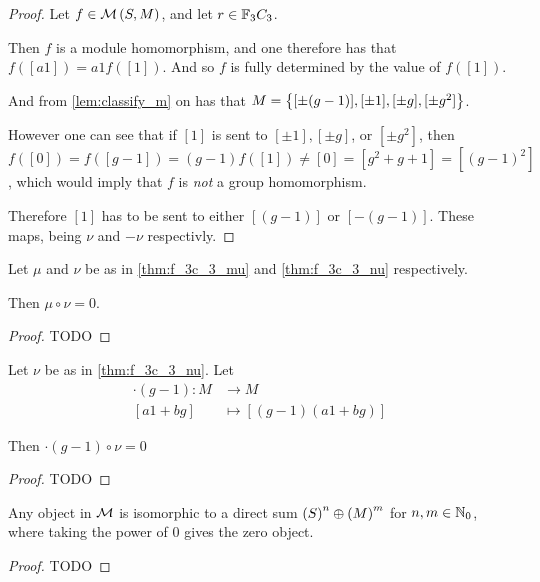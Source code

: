 \begin{proof}
    Let \( f \in {\mathcal{M}}\left( S, M \right) \), and let \( r \in {\mathbb{F}}_3C_3 \).
    
    Then \( f \) is a module homomorphism, and one therefore has that \( f([a1]) = a1 f([1]) \). And so \( f \) is fully determined by the value of \( f([1]) \). 
    
    And from \autoref{lem:classify_m} on has that \( M = \left\{ [\pm (g - 1)], [\pm 1], [\pm g], [\pm g^2] \right\} \).

    However one can see that if \( [1] \) is sent to \( [\pm 1], [\pm g] \), or \( [\pm g^2] \), then \( f([0]) = f([g - 1]) = (g - 1)f([1]) \neq [0] = [g^2 + g + 1] = [(g - 1)^2] \), which would imply that \( f \) is \emph{not} a group homomorphism.

    Therefore \( [1] \) has to be sent to either \( [(g - 1)] \) or \( [-(g - 1)] \). These maps, being \( \nu \) and \( -\nu \) respectivly.
\end{proof}

\begin{lemma} \label{thm:f_3c_3_mu_circ_nu_zero}
    Let \( \mu \) and \( \nu \) be as in \autoref{thm:f_3c_3_mu} and \autoref{thm:f_3c_3_nu} respectively.

    Then \( \mu \circ \nu = 0 \).
\end{lemma}
\begin{proof}
    TODO
\end{proof}

\begin{lemma} \label{lem:g-1_circ_nu_equals_zero}
    Let \( \nu \) be as in \autoref{thm:f_3c_3_nu}. Let
    \begin{align*}
        \cdot(g - 1): M &\to M \\
        [a1 + bg] &\mapsto [(g - 1)(a1 + bg)]
    \end{align*}

    Then \( \cdot(g - 1) \circ \nu = 0 \) 
\end{lemma}
\begin{proof}
    TODO
\end{proof}

\begin{lemma} \label{thm:f_3c_3_decomposition}
    Any object in \( {\mathcal{M}} \) is isomorphic to a direct sum \( \left(  S  \right)^n \oplus \left(  M  \right)^m \) for \( n, m \in {\mathbb{N}}_0 \), where taking the power of \( 0 \) gives the zero object.
\end{lemma}
\begin{proof}
    TODO
\end{proof}

